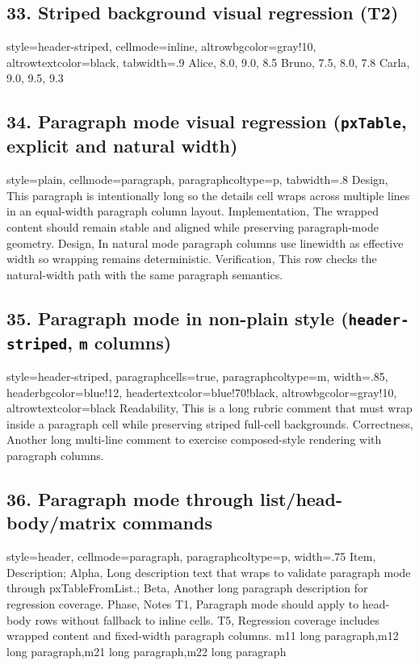 \documentclass{article}
\begin{document}
\subsection*{33. Striped background visual regression (T2)}
\pxTABsetup
  {
    style=header-striped,
    cellmode=inline,
    altrowbgcolor=gray!10,
    altrowtextcolor=black,
    tabwidth=.9\linewidth
  }
        {Alice, 8.0, 9.0, 8.5}
        {Bruno, 7.5, 8.0, 7.8}
        {Carla, 9.0, 9.5, 9.3}

\subsection*{34. Paragraph mode visual regression (\texttt{pxTable}, explicit and natural width)}
\pxTABsetup
  {
    style=plain,
    cellmode=paragraph,
    paragraphcoltype=p,
    tabwidth=.8\linewidth
  }
        {Design, This paragraph is intentionally long so the details cell wraps across multiple lines in an equal-width paragraph column layout.}
        {Implementation, The wrapped content should remain stable and aligned while preserving paragraph-mode geometry.}
        {Design, In natural mode paragraph columns use linewidth as effective width so wrapping remains deterministic.}
        {Verification, This row checks the natural-width path with the same paragraph semantics.}

\subsection*{35. Paragraph mode in non-plain style (\texttt{header-striped}, \texttt{m} columns)}
\pxTABsetup
  {
    style=header-striped,
    paragraphcells=true,
    paragraphcoltype=m,
    width=.85\linewidth,
    headerbgcolor=blue!12,
    headertextcolor=blue!70!black,
    altrowbgcolor=gray!10,
    altrowtextcolor=black
  }
        {Readability, This is a long rubric comment that must wrap inside a paragraph cell while preserving striped full-cell backgrounds.}
        {Correctness, Another long multi-line comment to exercise composed-style rendering with paragraph columns.}

\subsection*{36. Paragraph mode through list/head-body/matrix commands}
\pxTABsetup
  {
    style=header,
    cellmode=paragraph,
    paragraphcoltype=p,
    width=.75\linewidth
  }
\pxTableFromList
  {Item, Description; Alpha, Long description text that wraps to validate paragraph mode through pxTableFromList.; Beta, Another long paragraph description for regression coverage.}
\pxTableHeadBodyRows
  {Phase, Notes}
  {T1, Paragraph mode should apply to head-body rows without fallback to inline cells.}
  {T5, Regression coverage includes wrapped content and fixed-width paragraph columns.}
  {m11 long paragraph,m12 long paragraph,m21 long paragraph,m22 long paragraph}
\end{document}
